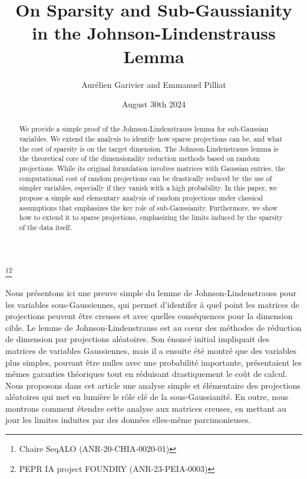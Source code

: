 \documentclass{ps}
\newcommand{\1}{\mathbbm{1}}
\theoremstyle{plain}
\begin{document}
\title{On Sparsity and Sub-Gaussianity in the Johnson-Lindenstrauss Lemma}\thanks{Chaire SeqALO (ANR-20-CHIA-0020-01)}\thanks{PEPR IA project FOUNDRY (ANR-23-PEIA-0003)}%
%
\author{Aurélien Garivier and Emmanuel Pilliat}\address{Univ. Lyon
	ENS de Lyon
	UMPA UMR 5669  /  LIP UMR 5668
	46 allée d'Italie
	F-69364 Lyon cedex 07
}
%
\date{August 30th 2024}
%
\begin{abstract} 
We provide a simple proof of the Johnson-Lindenstrauss lemma for sub-Gaussian variables. We extend the analysis to identify how sparse projections can be, and what the cost of sparsity is on the target dimension.
The Johnson-Lindenstrauss lemma is the theoretical core of the dimensionality reduction methods based on random projections. While its original formulation involves matrices with Gaussian entries, the computational cost of random projections can be drastically reduced by the use of simpler variables, especially if they vanish with a high probability. In this paper, we propose a simple and elementary analysis of random projections under classical assumptions that emphasizes the key role of sub-Gaussianity. Furthermore, we show how to extend it to sparse projections, emphasizing the limits induced by the sparsity of the data itself.
\end{abstract}
%
\begin{resume}
Nous présentons ici une preuve simple du lemme de Johnson-Lindenstrauss pour les variables sous-Gaussiennes, qui permet d'identifer à quel point les matrices de projections peuvent être creuses et avec quelles conséquences pour la dimension cible. 
Le lemme de Johnson-Lindenstrauss est au c\oe{}ur des méthodes de réduction de dimension par projections aléatoires. Son énoncé initial impliquait des matrices de variables Gaussiennes, mais il a ensuite été montré que des variables plus simples, pouvant être nulles avec une probabilité importante, présentaient les mêmes garanties théoriques tout en réduisant drastiquement le coût de calcul. 
Nous proposons dans cet article une analyse simple et élémentaire des projections aléatoires qui met en lumière le rôle clé de la sous-Gaussianité. En outre, nous montrons comment étendre cette analyse aux matrices creuses, en mettant au jour les limites induites par des données elles-même parcimonieuses. 
\end{resume}
%
%
%
\maketitle
\end{document}
